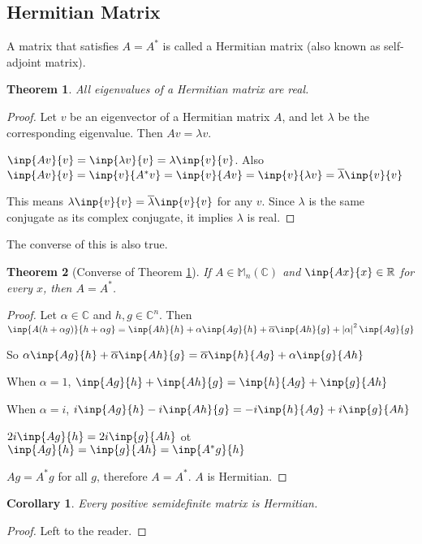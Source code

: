 \documentclass[twofold]{article}
\newcommand*\conj[1]{\overline{#1}}
\newcommand*\adj[1]{#1^*}
\newcommand*\abs[1]{\left \vert #1 \right\vert}
\theoremstyle{plain}
\newtheorem{theorem}{Theorem}
\newtheorem*{corollary}{Corollary}
\theoremstyle{definition}
\begin{document}
\subsection{Hermitian Matrix}
A matrix that satisfies \(A = \adj{A}\) is called a Hermitian matrix (also known as self-adjoint matrix). 

\begin{theorem} \label{herm_eig_real} All eigenvalues of a Hermitian matrix are real. \end{theorem}

\begin{proof}
Let \(v\) be an eigenvector of a Hermitian matrix \(A\), and let \(\lambda\) be the corresponding eigenvalue. Then \(Av = \lambda v\). 

\(\inp{Av}{v} = \inp{\lambda v}{v} = \lambda\inp{v}{v}\). Also \(\inp{Av}{v} = \inp{v}{\adj{A}v} = \inp{v}{Av} = \inp{v}{\lambda v} = \conj{\lambda} \inp{v}{v}\)

This means \(\lambda \inp{v}{v} = \conj{\lambda} \inp{v}{v}\) for any \(v\). Since \(\lambda\) is the same conjugate as its complex conjugate, it implies \(\lambda\) is real. 
 \end{proof}


The converse of this is also true. 
\begin{theorem} [Converse of Theorem \ref{herm_eig_real}] If \(A \in \mathbb{M}_n (\mathbb{C})\) and \(\inp{Ax}{x} \in \mathbb{R}\) for every \(x\), then \(A = \adj{A}\). \end{theorem}

\begin{proof} Let \(\alpha \in \mathbb{C}\) and \(h, g \in \mathbb{C}^n\). Then
\(\inp{A(h + \alpha g)}{h + \alpha g} = \inp{Ah}{h} + \alpha \inp{Ag}{h} + \conj{\alpha} \inp{Ah}{g} + \abs{\alpha}^2 \inp{Ag}{g} \)

So \(\alpha \inp{Ag}{h} + \conj{\alpha} \inp{Ah}{g} = \conj{\alpha} \inp{h}{Ag} + \alpha \inp{g}{Ah} \)

When \(\alpha = 1\), \(\inp{Ag}{h} + \inp{Ah}{g} = \inp{h}{Ag} + \inp{g}{Ah}\)\

When \(\alpha = i\), \(i \inp{Ag}{h} - i \inp{Ah}{g} = -i \inp{h}{Ag} + i \inp{g}{Ah}\)

\(2i \inp{Ag}{h} = 2i \inp{g}{Ah}\) ot \(\inp{Ag}{h} = \inp{g}{Ah} = \inp{\adj{A}g}{h}\)

\(Ag = \adj{A}g\) for all \(g\), therefore \(A = \adj{A}\). \(A\) is Hermitian.
 \end{proof}

\begin{corollary}Every positive semidefinite matrix is Hermitian.\end{corollary}
\begin{proof} Left to the reader. \end{proof}
\end{document}
